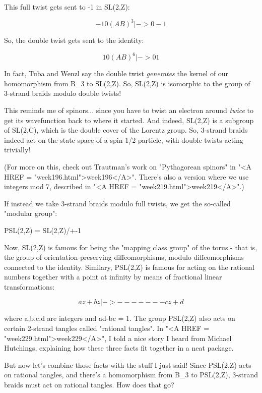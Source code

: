 This full twist gets sent to -1 in SL(2,Z):


$$

             -1   0 
(AB)^{3} |->  
              0  -1
$$
    
So, the double twist gets sent to the identity:


$$

             1   0 
(AB)^{6} |->  
             0   1
$$
    
In fact, Tuba and Wenzl say the double twist \emph{generates} the
kernel of our homomorphism from B_{3} to SL(2,Z).  So, SL(2,Z)
is isomorphic to the group of 3-strand braids modulo double twists!

This reminds me of spinors... since you have to twist an electron 
around \emph{twice} to get its wavefunction back to where it started.   
And indeed, SL(2,Z) is a subgroup of SL(2,C), which is the double 
cover of the Lorentz group.  So, 3-strand braids indeed act on the 
state space of a spin-1/2 particle, with double twists acting 
trivially!

(For more on this, check out Trautman's work on "Pythagorean
spinors" in "<A HREF = "week196.html">week196</A>".
There's also a version where we use integers mod 7, described in
"<A HREF = "week219.html">week219</A>".)

If instead we take 3-strand braids modulo full twists, we get the 
so-called "modular group":

PSL(2,Z) = SL(2,Z)/{+-1}

Now, SL(2,Z) is famous for being the "mapping class group"
of the torus - that is, the group of orientation-preserving
diffeomorphisms, modulo diffeomorphisms connected to the identity.
Similary, PSL(2,Z) is famous for acting on the rational numbers
together with a point at infinity by means of fractional linear
transformations:


$$

         az + b
z |->   -------
         cz + d
$$
    

where a,b,c,d are integers and ad-bc = 1.  The group PSL(2,Z) also
acts on certain 2-strand tangles called "rational tangles".
In "<A HREF = "week229.html">week229</A>", I told a nice
story I heard from Michael Hutchings, explaining how these three facts
fit together in a neat package.
 

But now let's combine those facts with the stuff I just said!  Since
PSL(2,Z) acts on rational tangles, and there's a homomorphism from
B_{3} to PSL(2,Z), 3-strand braids must act on rational
tangles.  How does that go?

